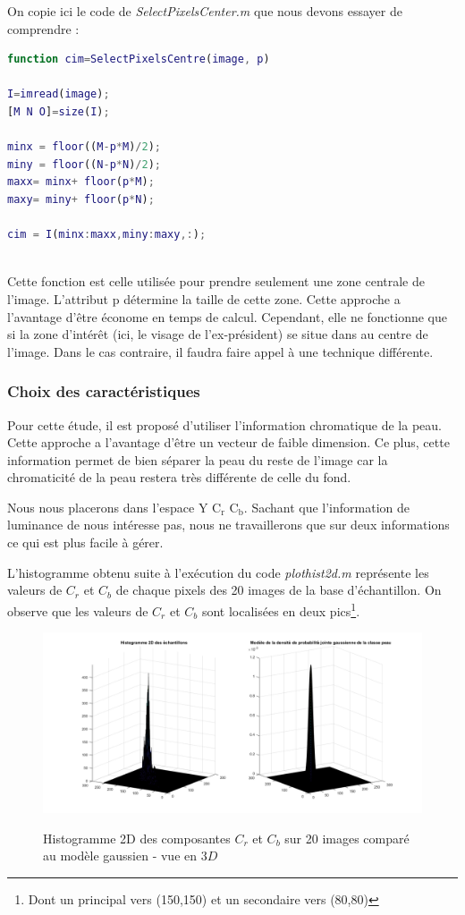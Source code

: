 \documentclass[11pt,a4paper]{article}
\begin{document}
On copie ici le code de \emph{SelectPixelsCenter.m} que nous devons essayer de comprendre :
 
\noindent\hrulefill
\begin{lstlisting}[language=matlab]
function cim=SelectPixelsCentre(image, p)

I=imread(image);
[M N O]=size(I);

minx = floor((M-p*M)/2);
miny = floor((N-p*N)/2);
maxx= minx+ floor(p*M);
maxy= miny+ floor(p*N);

cim = I(minx:maxx,miny:maxy,:);
\end{lstlisting}
\noindent\hrulefill
\\
Cette fonction est celle utilisée pour prendre seulement une zone centrale de l'image. L'attribut p détermine la taille de cette zone.
Cette approche a l'avantage d'être économe en temps de calcul. Cependant, elle ne fonctionne que si la zone d'intérêt (ici, le visage de l'ex-président) se situe dans au centre de l'image. Dans le cas contraire, il faudra faire appel à une technique différente.

\subsubsection{Choix des caractéristiques}
Pour cette étude, il est proposé d'utiliser l'information chromatique de la peau. Cette approche a l'avantage d'être un vecteur de faible dimension. Ce plus, cette information permet de bien séparer la peau du reste de l'image car la chromaticité de la peau restera très différente de celle du fond.

Nous nous placerons dans l'espace Y C$_\text{r}$ C$_\text{b}$. Sachant que l'information de luminance de nous intéresse pas, nous ne travaillerons que sur deux informations ce qui est plus facile à gérer.

L'histogramme obtenu suite à l'exécution du code \emph{plothist2d.m} représente les valeurs de $C_r$ et $C_b$ de chaque pixels des 20 images de la base d'échantillon. On observe que les valeurs de $C_r$ et $C_b$ sont localisées en deux pics\footnote{Dont un principal vers (150,150) et un secondaire vers (80,80)}.

\begin{figure}[H]
\center
\includegraphics[width=15cm]{exo2_hist2D.png}
\label{fig.exo2_histogramme2D}
\caption{Histogramme 2D des composantes $C_r$ et $C_b$ sur 20 images comparé au modèle gaussien - vue en $3D$}
\end{figure} 
\end{document}
